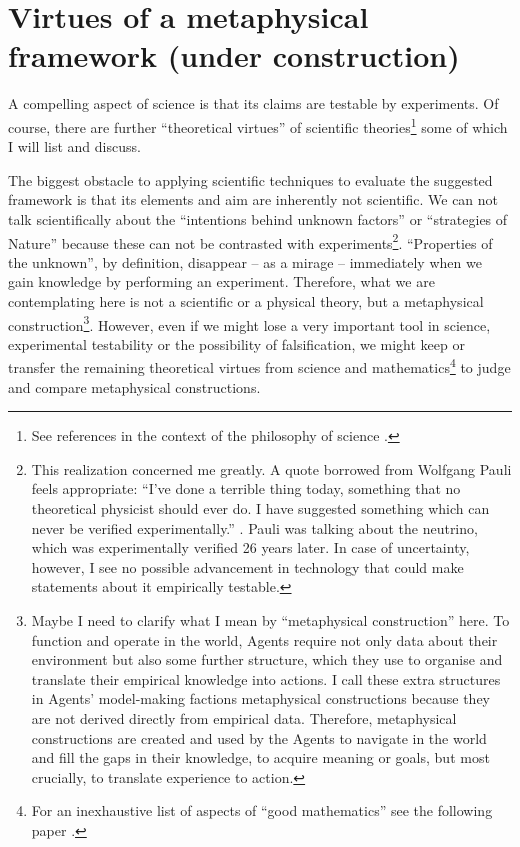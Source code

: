 \documentclass{article}
\begin{document}
\section*{Virtues of a metaphysical framework (under construction)}

A compelling aspect of science is that its claims are testable by experiments. Of course, there are further ``theoretical virtues'' of scientific theories\footnote{See references in the context of the philosophy of science \cite{paper:TheoreticalVirtues,book:TheoreticalVirtues}.} some of which I will list and discuss.

The biggest obstacle to applying scientific techniques to evaluate the suggested framework is that its elements and aim are inherently not scientific.
We can not talk scientifically about the ``intentions behind unknown factors'' or ``strategies of Nature'' because these can not be contrasted with experiments\footnote{This realization concerned me greatly. A quote borrowed from Wolfgang Pauli feels appropriate: ``I've done a terrible thing today, something that no
theoretical physicist should ever do. I have suggested something which can never be verified experimentally.'' \cite{paper:PuliQuote}. Pauli was talking about the neutrino, which was experimentally verified 26 years later. In case of uncertainty, however, I see no possible advancement in technology that could make statements about it empirically testable.}.
``Properties of the unknown'', by definition, disappear -- as a mirage -- immediately when we gain knowledge by performing an experiment.
Therefore, what we are contemplating here is not a scientific or a physical theory, but a metaphysical construction\footnote{Maybe I need to clarify what I mean by ``metaphysical construction'' here. To function and operate in the world, Agents require not only data about their environment but also some further structure, which they use to organise and translate their empirical knowledge into actions. I call these extra structures in Agents' model-making factions metaphysical constructions because they are not derived directly from empirical data. Therefore, metaphysical constructions are created and used by the Agents to navigate in the world and fill the gaps in their knowledge, to acquire meaning or goals, but most crucially, to translate experience to action.}.
However, even if we might lose a very important tool in science, experimental testability or the possibility of falsification, we might keep or transfer the remaining theoretical virtues from science and mathematics\footnote{For an inexhaustive list of aspects of ``good mathematics'' see the following paper \cite{arxiv:GoodMathematics}.} to judge and compare metaphysical constructions.
\end{document}
